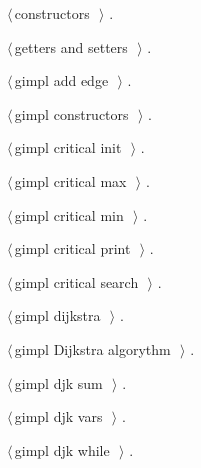 \documentclass[12pt]{article}
\begin{document}
{\small\begin{list}{}{\setlength{\itemsep}{-\parsep}\setlength{\itemindent}{-\leftmargin}}
\item $\langle\,$constructors\nobreak\ {\footnotesize {}}$\,\rangle$ {\footnotesize {\NWtxtRefIn} .}
\item $\langle\,$getters and setters\nobreak\ {\footnotesize {}}$\,\rangle$ {\footnotesize {\NWtxtRefIn} .}
\item $\langle\,$gimpl add edge\nobreak\ {\footnotesize {}}$\,\rangle$ {\footnotesize {\NWtxtRefIn} .}
\item $\langle\,$gimpl constructors\nobreak\ {\footnotesize {}}$\,\rangle$ {\footnotesize {\NWtxtRefIn} .}
\item $\langle\,$gimpl critical init\nobreak\ {\footnotesize {}}$\,\rangle$ {\footnotesize {\NWtxtRefIn} .}
\item $\langle\,$gimpl critical max\nobreak\ {\footnotesize {}}$\,\rangle$ {\footnotesize {\NWtxtRefIn} .}
\item $\langle\,$gimpl critical min\nobreak\ {\footnotesize {}}$\,\rangle$ {\footnotesize {\NWtxtRefIn} .}
\item $\langle\,$gimpl critical print\nobreak\ {\footnotesize {}}$\,\rangle$ {\footnotesize {\NWtxtRefIn} .}
\item $\langle\,$gimpl critical search\nobreak\ {\footnotesize {}}$\,\rangle$ {\footnotesize {\NWtxtRefIn} .}
\item $\langle\,$gimpl dijkstra\nobreak\ {\footnotesize {}}$\,\rangle$ {\footnotesize {\NWtxtRefIn} .}
\item $\langle\,$gimpl Dijkstra algorythm\nobreak\ {\footnotesize {}}$\,\rangle$ {\footnotesize {\NWtxtRefIn} .}
\item $\langle\,$gimpl djk sum\nobreak\ {\footnotesize {}}$\,\rangle$ {\footnotesize {\NWtxtRefIn} .}
\item $\langle\,$gimpl djk vars\nobreak\ {\footnotesize {}}$\,\rangle$ {\footnotesize {\NWtxtRefIn} .}
\item $\langle\,$gimpl djk while\nobreak\ {\footnotesize {}}$\,\rangle$ {\footnotesize {\NWtxtRefIn} .}

\end{list}}
\end{document}
